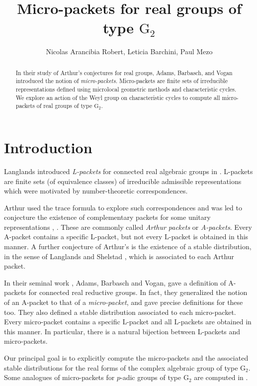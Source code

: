 \documentclass[a4paper, 11pt]{article}
\title{Micro-packets for real groups of type $\mathrm{G}_{2}$}
\author{ Nicolas Arancibia Robert, Leticia Barchini, Paul Mezo}
\begin{document}
\maketitle

\begin{abstract}
In their study of Arthur's conjectures for real groups, Adams,
Barbasch, and Vogan introduced the notion of
\emph{micro-packets}. Micro-packets are finite sets of irreducible
representations defined using microlocal geometric methods and
characteristic cycles. We explore an action of the Weyl group on
characteristic cycles to compute all micro-packets of real groups of
type $\mathrm{G}_2$. 
\end{abstract}

\tableofcontents

\section{Introduction}

Langlands
introduced \emph{L-packets} for connected real algebraic groups in
\cite{Langlands}.  L-packets are finite sets (of equivalence
classes) of irreducible admissible representations which were motivated
by number-theoretic correspondences.  

Arthur used the trace formula to  explore such correspondences and
was led to conjecture the existence of
complementary packets for some unitary representations
\cite{Arthur84}, \cite{Arthur89}.  These are commonly called \emph{Arthur
packets} or \emph{A-packets}.  Every A-packet contains a specific
L-packet, but not every L-packet is obtained in this manner. A further
conjecture of Arthur's is the existence of a stable distribution, in
the sense of Langlands and Shelstad \cite{Shel82}, which is associated to each
Arthur packet.  
       
In their seminal work \cite{ABV}, Adams, Barbasch and Vogan, gave a
definition of A-packets for connected real reductive groups.  In fact, they
generalized the notion of an A-packet to that of a
\emph{micro-packet}, and gave precise definitions for these too.  They also
defined a stable distribution associated to each micro-packet. Every 
micro-packet contains a specific L-packet 
and all L-packets are obtained in this manner.  In particular, there
is a natural bijection between L-packets
and  micro-packets.

Our principal goal is to explicitly compute the
micro-packets and the associated stable distributions for the real forms of the
complex algebraic group of type $\mathrm{G}_{2}$. Some analogues of
micro-packets for $p$-adic groups of type $\mathrm{G}_{2}$ are computed in
\cite{Cunningham21, Cunningham22}.
\end{document}
